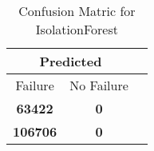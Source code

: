 \begin{table}[] 
\caption{Confusion Matric for IsolationForest} 
\label{Table: Prediction Accuracy-NoneIsolationForestSVMEKF-ignoresolarPanelDipole-solarPanelDipole} 
\centering 
\begin{tabular} 
 {@{}ccc@{}} 
\toprule 
\multicolumn{2}{c}{\textbf{Predicted}}
 \\ \midrule 
\multicolumn{1}{|c|}{Failure} & 
\multicolumn{1}{c|}{No Failure}
 \\ \midrule 
\multicolumn{1}{|c|}{\color{red}\textbf{63422}} & 
\multicolumn{1}{c|}{\color{green}\textbf{0}}
 \\ \midrule 
\multicolumn{1}{|c|}{\color{green}\textbf{106706}} & 
\multicolumn{1}{c|}{\color{green}\textbf{0}}
 \\ \bottomrule 
\end{tabular} 
\end{table} 
